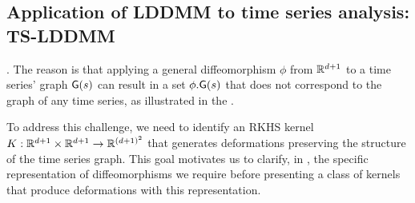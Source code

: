   



    

   \subsection{Application of LDDMM to time series analysis: TS-LDDMM}

        \label{section:time_series_specificity}
        .
          The reason is that applying a general diffeomorphism $\phi$ from $\mathbb{R}^{d+1}$ to a time series' graph $\mathsf{G}(s)$ can result in a set $\phi.\mathsf{G}(s)$ that does not correspond to the graph of any time series, as illustrated in the .

To address this challenge, we need to identify an RKHS kernel $K:\mathbb{R}^{d+1}\times \mathbb{R}^{d+1}\to \mathbb{R}^{(d+1)^2}$ that generates deformations preserving the structure of the time series graph. This goal motivates us to clarify, in , the specific representation of diffeomorphisms we require before presenting a class of kernels that produce deformations with this representation.

